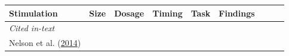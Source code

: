 \documentclass[11pt,]{memoir}
\begin{document}
\begin{longtable}[]{@{}lllllllll@{}}
\begin{minipage}[b]{0.10\columnwidth}
Stimulation\strut
\end{minipage} & \begin{minipage}[b]{0.03\columnwidth}\raggedright
Size\strut
\end{minipage} & \begin{minipage}[b]{0.05\columnwidth}\raggedright
Dosage\strut
\end{minipage} & \begin{minipage}[b]{0.06\columnwidth}\raggedright
Timing\strut
\end{minipage} & \begin{minipage}[b]{0.12\columnwidth}\raggedright
Task\strut
\end{minipage} & \begin{minipage}[b]{0.25\columnwidth}\raggedright
Findings\strut
\end{minipage}\tabularnewline
\midrule
\endhead
\begin{minipage}[t]{0.09\columnwidth}\raggedright
\emph{Cited in-text}\strut
\end{minipage} & \begin{minipage}[t]{0.02\columnwidth}\raggedright
\strut
\end{minipage} & \begin{minipage}[t]{0.04\columnwidth}\raggedright
\strut
\end{minipage} & \begin{minipage}[t]{0.10\columnwidth}\raggedright
\strut
\end{minipage} & \begin{minipage}[t]{0.03\columnwidth}\raggedright
\strut
\end{minipage} & \begin{minipage}[t]{0.05\columnwidth}\raggedright
\strut
\end{minipage} & \begin{minipage}[t]{0.06\columnwidth}\raggedright
\strut
\end{minipage} & \begin{minipage}[t]{0.12\columnwidth}\raggedright
\strut
\end{minipage} & \begin{minipage}[t]{0.25\columnwidth}\raggedright
\strut
\end{minipage}\tabularnewline
\begin{minipage}[t]{0.09\columnwidth}\raggedright
Nelson et al. (\protect\hyperlink{ref-Nelson2014}{2014})\strut
\end{minipage} & \begin{minipage}[t]{0.02\columnwidth}\raggedright

\end{minipage}
\end{longtable}
\end{document}

